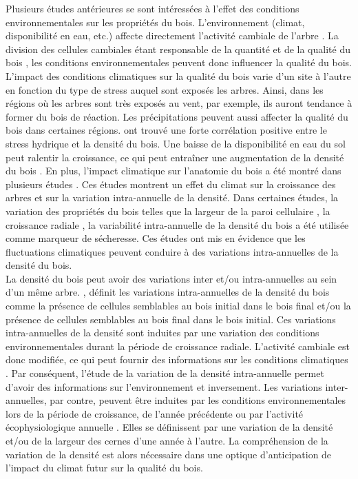 \documentclass[a4paper,12pt]{report}
\begin{document}
Plusieurs études antérieures se sont intéressées à l'effet des conditions environnementales sur les propriétés du bois. L'environnement (climat, disponibilité en eau, etc.) affecte directement l'activité cambiale de l'arbre \citep{FRITTS1976,Kozlowski1997}. La division des cellules cambiales étant responsable de la quantité et de la qualité du bois \citep{Begum2013}, les conditions environnementales peuvent donc influencer la qualité du bois. L'impact des conditions climatiques sur la qualité du bois varie d'un site à l'autre en fonction du type de stress auquel sont exposés les arbres. Ainsi, dans les régions où les arbres sont très exposés au vent, par exemple, ils auront tendance à former du bois de réaction. Les précipitations peuvent aussi affecter la qualité du bois dans certaines régions. \cite{Bouriaud2005} ont trouvé une forte corrélation positive entre le stress hydrique et la densité du bois. Une baisse de la disponibilité en eau du sol peut ralentir la croissance, ce qui peut entraîner une augmentation de la densité du bois \citep{GARDINER2011}. En plus, l'impact climatique sur l'anatomie du bois a été montré dans plusieurs études \citep{Bouriaud2005,Fritts2001,Campelo2013}. Ces études montrent un effet du climat sur la croissance des arbres et sur la variation intra-annuelle de la densité. Dans certaines études, la variation des propriétés du bois telles que la largeur de la paroi cellulaire \citep{Fritts2001}, la croissance radiale \citep{Jyske2009}, la variabilité intra-annuelle de la densité du bois \citep{Wimmer2000,Rigling2001,Wilkinson2015} a été utilisée comme marqueur de sécheresse. Ces études ont mis en évidence que les fluctuations climatiques peuvent conduire à des variations intra-annuelles de la densité du bois. \\

La densité du bois peut avoir des variations inter et/ou intra-annuelles au sein d'un même arbre. \cite{Fritts2001}, définit les variations intra-annuelles de la densité du bois comme la présence de cellules semblables au bois initial dans le bois final et/ou la présence de cellules semblables au bois final dans le bois initial. Ces variations intra-annuelles de la densité sont induites par une variation des conditions environnementales durant la période de croissance radiale. L'activité cambiale est donc modifiée, ce qui peut fournir des informations sur les conditions climatiques \citep{Campeloa2007,Campelo2013,Novak2013}. Par conséquent, l'étude de la variation de la densité intra-annuelle permet d'avoir des informations sur l'environnement et inversement. Les variations inter-annuelles, par contre, peuvent être induites par les conditions environnementales lors de la période de croissance, de l'année précédente ou par l'activité écophysiologique annuelle \citep{Hughes1984,DArrigo1992}. Elles se définissent par une variation de la densité et/ou de la largeur des cernes d'une année à l'autre. La compréhension de la variation de la densité est alors nécessaire dans une optique d'anticipation de l'impact du climat futur sur la qualité du bois.\\
\end{document}
